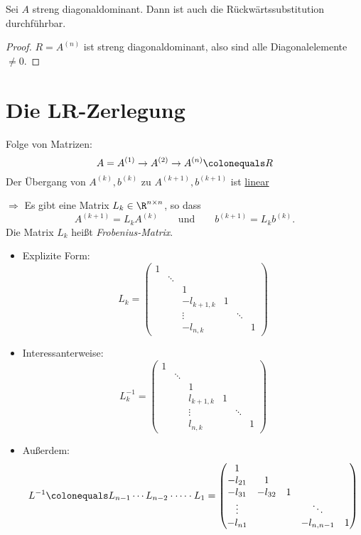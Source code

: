 \begin{kor} Sei $A$ streng diagonaldominant. Dann ist auch die Rückwärtssubstitution durchführbar.
\end{kor}
\begin{proof}
$R = A^{(n)}$ ist streng diagonaldominant, also sind alle Diagonalelemente $\neq 0$.
\end{proof}

\section{Die LR-Zerlegung}

Folge von Matrizen:
\begin{equation*}
A = A^{(1)} \rightarrow A^{(2)} \rightarrow A^{(n)} \colonequals R
\end{equation*}
Der Übergang von $A^{(k)}, b^{(k)}$ zu $A^{(k+1)}, b^{(k+1)}$ ist \underline{linear}
\medskip

\qquad $\Rightarrow$ Es gibt eine Matrix $L_k \in \R^{n \times n}$, so dass
\begin{equation*}
A^{(k+1)} = L_k A^{(k)}
\qquad \text{und} \qquad
b^{(k+1)} = L_k b^{(k)}.
\end{equation*}
Die Matrix $L_k$ heißt \emph{Frobenius-Matrix}.
\begin{itemize}
\item Explizite Form:
\begin{equation*}
L_k = \begin{pmatrix}
1 & & & & &
\\ & \ddots & & & &
\\ & & 1 & & &
\\ & & -l_{k+1, k} & 1 & &
\\ & & \vdots & & \ddots &
\\ & & -l_{n,k} & & & 1
\end{pmatrix}
\end{equation*}
\item Interessanterweise:
\begin{equation*}
L_k^{-1} = \begin{pmatrix}
1 & & & & &
\\ & \ddots & & & &
\\ & & 1 & & &
\\ & & l_{k+1, k} & 1 & &
\\ & & \vdots & & \ddots &
\\ & & l_{n,k} & & & 1
\end{pmatrix}
\end{equation*}
\item Außerdem:
\begin{equation*}
L^{-1} \colonequals L_{n-1} \cdots L_{n-2} \cdot \dots \cdot L_1= \begin{pmatrix}
1 & & & &
\\ -l_{21}& 1 & & &
\\ -l_{31}& -l_{32} & 1& &
\\ \vdots & & & \ddots &
\\ -l_{n1} & & & -l_{n, n-1} & 1
\end{pmatrix}
\end{equation*}
\end{itemize}

